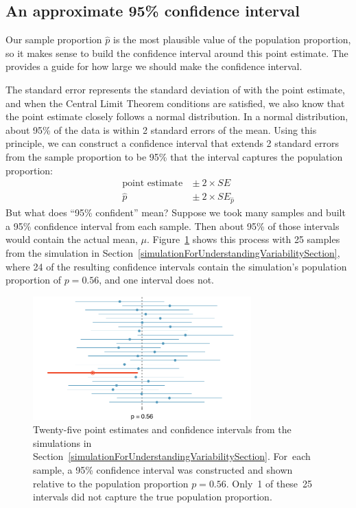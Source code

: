 \subsection{An approximate 95\% confidence interval}

Our sample proportion $\hat{p}$ is the most plausible
value of the population proportion, so it makes sense
to build the confidence interval around this point estimate.
The  provides a guide for how
large we should make the confidence interval.

The standard error represents the standard deviation
of with the point estimate, and when the Central
Limit Theorem conditions are satisfied, we also know
that the point estimate closely follows a normal
distribution. In a normal distribution, about 95\% of
the data is within 2 standard errors of the mean.
Using this principle, we can construct a confidence
interval that extends 2 standard errors from the sample
proportion to be 95\%  that the interval
captures the population proportion:
\begin{align*}
\text{point estimate}\ &\pm\ 2\times SE \\
\hat{p}\ &\pm\ 2\times SE_{\hat{p}}
\end{align*}
But what does ``95\% confident'' mean? Suppose we took
many samples and built a 95\% confidence interval from
each sample. Then about 95\% of those intervals would
contain the actual mean, $\mu$.
Figure~\ref{95PercentConfidenceInterval} shows this
process with 25 samples from the simulation in
Section~\ref{simulationForUnderstandingVariabilitySection},
where 24 of the resulting confidence intervals contain
the simulation's population proportion of $p = 0.56$,
and one interval does not.

\begin{figure}
   \centering
   \includegraphics[width=0.75\textwidth]{ch_inference_for_props/figures/95PercentConfidenceInterval/95PercentConfidenceInterval}
   \caption{Twenty-five point estimates and confidence
       intervals from the simulations in
       Section~\ref{simulationForUnderstandingVariabilitySection}.
       For~each sample, a 95\% confidence interval was
       constructed and shown relative to the population
       proportion $p = 0.56$. Only~1 of these~25
       intervals did not capture the true population
       proportion.}
   \label{95PercentConfidenceInterval}
\end{figure}

